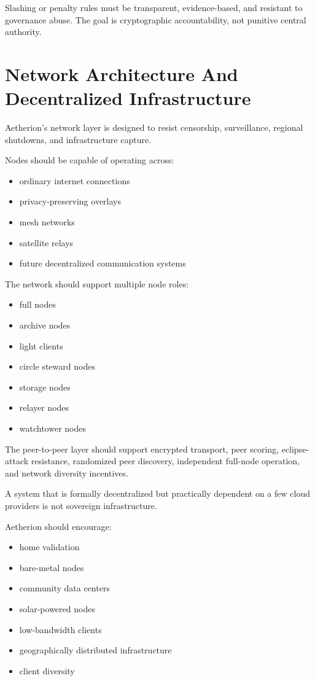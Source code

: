 ﻿\documentclass[12pt]{article}
\begin{document}
Slashing or penalty rules must be transparent, evidence-based, and resistant to governance abuse. The goal is cryptographic accountability, not punitive central authority.

\section{Network Architecture And Decentralized Infrastructure}


Aetherion's network layer is designed to resist censorship, surveillance, regional shutdowns, and infrastructure capture.

Nodes should be capable of operating across:

\begin{itemize}
  \item ordinary internet connections
  \item privacy-preserving overlays
  \item mesh networks
  \item satellite relays
  \item future decentralized communication systems
\end{itemize}

The network should support multiple node roles:

\begin{itemize}
  \item full nodes
  \item archive nodes
  \item light clients
  \item circle steward nodes
  \item storage nodes
  \item relayer nodes
  \item watchtower nodes
\end{itemize}

The peer-to-peer layer should support encrypted transport, peer scoring, eclipse-attack resistance, randomized peer discovery, independent full-node operation, and network diversity incentives.

A system that is formally decentralized but practically dependent on a few cloud providers is not sovereign infrastructure.

Aetherion should encourage:

\begin{itemize}
  \item home validation
  \item bare-metal nodes
  \item community data centers
  \item solar-powered nodes
  \item low-bandwidth clients
  \item geographically distributed infrastructure
  \item client diversity
\end{itemize}
\end{document}

